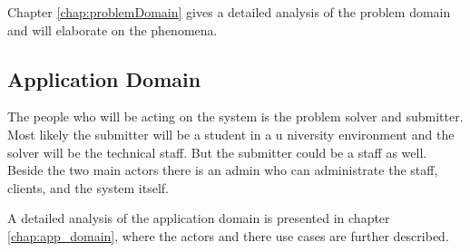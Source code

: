Chapter \ref{chap:problemDomain} gives a detailed analysis of the problem domain and will elaborate on the phenomena.

\subsection{Application Domain}
The people who will be acting on the system is the problem solver and submitter. Most likely the submitter will be a student in a u niversity environment and the solver will be the technical staff. But the submitter could be a staff as well. Beside the two main actors there is an admin who can administrate the staff, clients, and the system itself.

A detailed analysis of the application domain is presented in chapter \ref{chap:app_domain}, where the actors and there use cases are further described.
